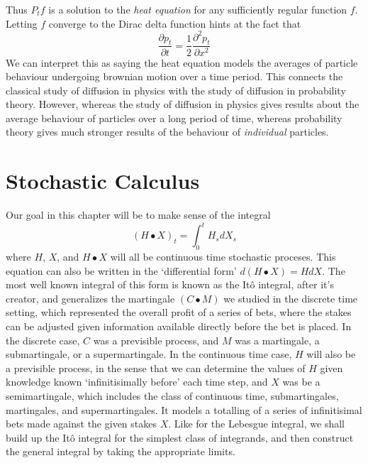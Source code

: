 %
Thus $P_tf$ is a solution to the {\it heat equation} for any sufficiently regular function $f$. Letting $f$ converge to the Dirac delta function hints at the fact that
%
\[ \frac{\partial p_t}{\partial t} = \frac{1}{2} \frac{\partial^2 p_t}{\partial x^2} \]
%
We can interpret this as saying the heat equation models the averages of particle behaviour undergoing brownian motion over a time period. This connects the classical study of diffusion in physics with the study of diffusion in probability theory. However, whereas the study of diffusion in physics gives results about the average behaviour of particles over a long period of time, whereas probability theory gives much stronger results of the behaviour of {\it individual} particles.

\chapter{Stochastic Calculus}

Our goal in this chapter will be to make sense of the integral
%
\[ (H \bullet X)_t = \int_0^t H_s dX_s \]
%
where $H$, $X$, and $H \bullet X$ will all be continuous time stochastic proceses. This equation can also be written in the `differential form' $d(H \bullet X) = H dX$. The most well known integral of this form is known as the It\^{o} integral, after it's creator, and generalizes the martingale $(C \bullet M)$ we studied in the discrete time setting, which represented the overall profit of a series of bets, where the stakes can be adjusted given information available directly before the bet is placed. In the discrete case, $C$ was a previsible process, and $M$ was a martingale, a submartingale, or a supermartingale. In the continuous time case, $H$ will also be a previsible process, in the sense that we can determine the values of $H$ given knowledge known `infinitisimally before' each time step, and $X$ was be a semimartingale, which includes the class of continuous time, submartingales, martingales, and supermartingales. It models a totalling of a series of infinitisimal bets made against the given stakes $X$. Like for the Lebesgue integral, we shall build up the It\^{o} integral for the simplest class of integrands, and then construct the general integral by taking the appropriate limits.


